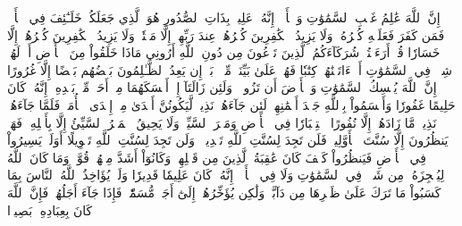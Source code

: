 إِنَّ ٱللَّهَ عَٰلِمُ غَيۡبِ ٱلسَّمَٰوَٰتِ وَٱلۡأَرۡضِۚ إِنَّهُۥ عَلِيمُۢ بِذَاتِ ٱلصُّدُورِ
هُوَ ٱلَّذِي جَعَلَكُمۡ خَلَـٰٓئِفَ فِي ٱلۡأَرۡضِۚ فَمَن كَفَرَ فَعَلَيۡهِ كُفۡرُهُۥۖ وَلَا يَزِيدُ ٱلۡكَٰفِرِينَ كُفۡرُهُمۡ عِندَ رَبِّهِمۡ إِلَّا مَقۡتٗاۖ وَلَا يَزِيدُ ٱلۡكَٰفِرِينَ كُفۡرُهُمۡ إِلَّا خَسَارٗا
قُلۡ أَرَءَيۡتُمۡ شُرَكَآءَكُمُ ٱلَّذِينَ تَدۡعُونَ مِن دُونِ ٱللَّهِ أَرُونِي مَاذَا خَلَقُواْ مِنَ ٱلۡأَرۡضِ أَمۡ لَهُمۡ شِرۡكٞ فِي ٱلسَّمَٰوَٰتِ أَمۡ ءَاتَيۡنَٰهُمۡ كِتَٰبٗا فَهُمۡ عَلَىٰ بَيِّنَتٖ مِّنۡهُۚ بَلۡ إِن يَعِدُ ٱلظَّـٰلِمُونَ بَعۡضُهُم بَعۡضًا إِلَّا غُرُورًا
۞إِنَّ ٱللَّهَ يُمۡسِكُ ٱلسَّمَٰوَٰتِ وَٱلۡأَرۡضَ أَن تَزُولَاۚ وَلَئِن زَالَتَآ إِنۡ أَمۡسَكَهُمَا مِنۡ أَحَدٖ مِّنۢ بَعۡدِهِۦٓۚ إِنَّهُۥ كَانَ حَلِيمًا غَفُورٗا
وَأَقۡسَمُواْ بِٱللَّهِ جَهۡدَ أَيۡمَٰنِهِمۡ لَئِن جَآءَهُمۡ نَذِيرٞ لَّيَكُونُنَّ أَهۡدَىٰ مِنۡ إِحۡدَى ٱلۡأُمَمِۖ فَلَمَّا جَآءَهُمۡ نَذِيرٞ مَّا زَادَهُمۡ إِلَّا نُفُورًا
ٱسۡتِكۡبَارٗا فِي ٱلۡأَرۡضِ وَمَكۡرَ ٱلسَّيِّيِٕۚ وَلَا يَحِيقُ ٱلۡمَكۡرُ ٱلسَّيِّئُ إِلَّا بِأَهۡلِهِۦۚ فَهَلۡ يَنظُرُونَ إِلَّا سُنَّتَ ٱلۡأَوَّلِينَۚ فَلَن تَجِدَ لِسُنَّتِ ٱللَّهِ تَبۡدِيلٗاۖ وَلَن تَجِدَ لِسُنَّتِ ٱللَّهِ تَحۡوِيلًا
أَوَلَمۡ يَسِيرُواْ فِي ٱلۡأَرۡضِ فَيَنظُرُواْ كَيۡفَ كَانَ عَٰقِبَةُ ٱلَّذِينَ مِن قَبۡلِهِمۡ وَكَانُوٓاْ أَشَدَّ مِنۡهُمۡ قُوَّةٗۚ وَمَا كَانَ ٱللَّهُ لِيُعۡجِزَهُۥ مِن شَيۡءٖ فِي ٱلسَّمَٰوَٰتِ وَلَا فِي ٱلۡأَرۡضِۚ إِنَّهُۥ كَانَ عَلِيمٗا قَدِيرٗا
وَلَوۡ يُؤَاخِذُ ٱللَّهُ ٱلنَّاسَ بِمَا كَسَبُواْ مَا تَرَكَ عَلَىٰ ظَهۡرِهَا مِن دَآبَّةٖ وَلَٰكِن يُؤَخِّرُهُمۡ إِلَىٰٓ أَجَلٖ مُّسَمّٗىۖ فَإِذَا جَآءَ أَجَلُهُمۡ فَإِنَّ ٱللَّهَ كَانَ بِعِبَادِهِۦ بَصِيرَۢا